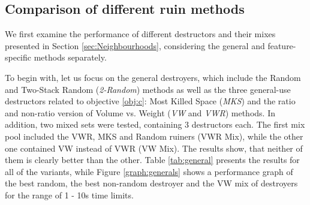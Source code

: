 \documentclass[preprint,12pt,3p]{elsarticle}
\begin{document}
\subsection{Comparison of different ruin methods}
We first examine the performance of different destructors and their mixes presented in Section \ref{sec:Neighbourhoods}, considering the general and feature-specific methods separately.

To begin with, let us focus on the general destroyers, which include the Random and Two-Stack Random (\textit{2-Random}) methods as well as the three general-use destructors related to objective \ref{obj:c}: Most Killed Space (\textit{MKS}) and the ratio and non-ratio version of Volume vs. Weight (\textit{VW} and \textit{VWR}) methods. In addition, two mixed sets were tested, containing 3 destructors each. The first mix pool included the VWR, MKS and Random ruiners (VWR Mix), while the other one contained VW instead of VWR (VW Mix). The results show, that neither of them is clearly better than the other. Table \ref{tab:general} presents the results for all of the variants, while Figure \ref{graph:generals} shows a performance graph of the best random, the best non-random destroyer and the VW mix of destroyers for the range of 1 - 10s time limits. 
\end{document}
